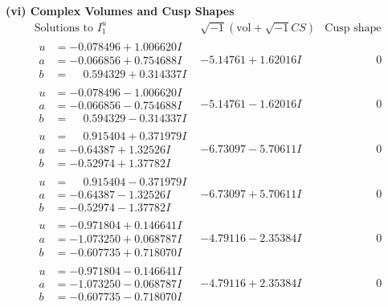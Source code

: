 \documentclass[1p]{elsarticle_modified}
\theoremstyle{definition}
\newcommand{\I}{\sqrt{-1}}
\begin{document}
\newpage\flushleft \textbf{(vi) Complex Volumes and Cusp Shapes}
$$\begin{array}{c|c|c}  
\text{Solutions to }I^u_{1}& \I (\text{vol} + \sqrt{-1}CS) & \text{Cusp shape}\\
 \hline 
\begin{aligned}
u &= -0.078496 + 1.006620 I \\
a &= -0.066856 + 0.754688 I \\
b &= \phantom{-}0.594329 + 0.314337 I\end{aligned}
 & -5.14761 + 1.62016 I & \phantom{-0.000000 } 0 \\ \hline\begin{aligned}
u &= -0.078496 - 1.006620 I \\
a &= -0.066856 - 0.754688 I \\
b &= \phantom{-}0.594329 - 0.314337 I\end{aligned}
 & -5.14761 - 1.62016 I & \phantom{-0.000000 } 0 \\ \hline\begin{aligned}
u &= \phantom{-}0.915404 + 0.371979 I \\
a &= -0.64387 + 1.32526 I \\
b &= -0.52974 + 1.37782 I\end{aligned}
 & -6.73097 - 5.70611 I & \phantom{-0.000000 } 0 \\ \hline\begin{aligned}
u &= \phantom{-}0.915404 - 0.371979 I \\
a &= -0.64387 - 1.32526 I \\
b &= -0.52974 - 1.37782 I\end{aligned}
 & -6.73097 + 5.70611 I & \phantom{-0.000000 } 0 \\ \hline\begin{aligned}
u &= -0.971804 + 0.146641 I \\
a &= -1.073250 + 0.068787 I \\
b &= -0.607735 + 0.718070 I\end{aligned}
 & -4.79116 - 2.35384 I & \phantom{-0.000000 } 0 \\ \hline\begin{aligned}
u &= -0.971804 - 0.146641 I \\
a &= -1.073250 - 0.068787 I \\
b &= -0.607735 - 0.718070 I\end{aligned}
 & -4.79116 + 2.35384 I & \phantom{-0.000000 } 0 \\ \hline\begin{aligned}

\end{aligned}
\end{array}$$
\end{document}
